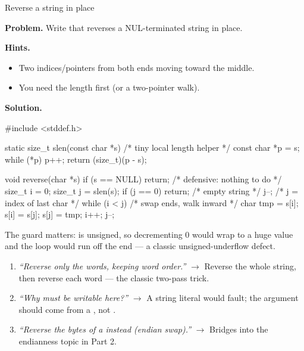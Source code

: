 \begin{gymproblem}{Reverse a string in place}

\textbf{Problem.} Write  that reverses a
NUL-terminated string in place.

\textbf{Hints.}
\begin{itemize}
\item Two indices/pointers from both ends moving toward the middle.
\item You need the length first (or a two-pointer walk).
\end{itemize}

\attempt

\textbf{Solution.}
\begin{cgym}
#include <stddef.h>

static size_t slen(const char *s) {     /* tiny local length helper */
    const char *p = s;
    while (*p) p++;
    return (size_t)(p - s);
}

void reverse(char *s) {
    if (s == NULL) return;               /* defensive: nothing to do  */
    size_t i = 0;
    size_t j = slen(s);
    if (j == 0) return;                  /* empty string              */
    j--;                                 /* j = index of last char    */
    while (i < j) {                      /* swap ends, walk inward    */
        char tmp = s[i];
        s[i] = s[j];
        s[j] = tmp;
        i++;
        j--;
    }
}
\end{cgym}

The guard  matters:  is unsigned, so decrementing 0
would wrap to a huge value and the loop would run off the end --- a classic
unsigned-underflow defect.

\followups
\begin{enumerate}
\item \emph{``Reverse only the words, keeping word order.''} $\rightarrow$
  Reverse the whole string, then reverse each word --- the classic two-pass
  trick.
\item \emph{``Why must  be writable here?''} $\rightarrow$ A string
  literal would fault; the argument should come from a , not
  .
\item \emph{``Reverse the bytes of a  instead (endian
  swap).''} $\rightarrow$ Bridges into the endianness topic in Part 2.
\end{enumerate}
\end{gymproblem}

